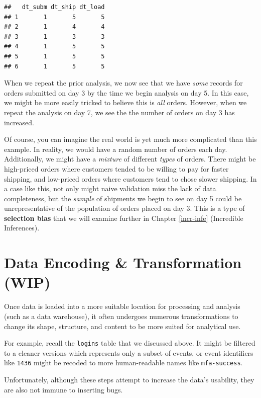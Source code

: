 \documentclass[
]{krantz}
\begin{document}
\begin{verbatim}
##   dt_subm dt_ship dt_load
## 1       1       5       5
## 2       1       4       4
## 3       1       3       3
## 4       1       5       5
## 5       1       5       5
## 6       1       5       5
\end{verbatim}

When we repeat the prior analysis, we now see that we have \emph{some} records for orders submitted on day 3 by the time we begin analysis on day 5.
In this case, we might be more easily tricked to believe this is \emph{all} orders.
However, when we repeat the analysis on day 7, we see the the number of orders on day 3 has increased.

Of course, you can imagine the real world is yet much more complicated than this example.
In reality, we would have a random number of orders each day.
Additionally, we might have a \emph{mixture} of different \emph{types} of orders.
There might be high-priced orders where customers tended to be willing to pay for faster shipping,
and low-priced orders where customers tend to chose slower shipping.
In a case like this, not only might naive validation miss the lack of data completeness, but the \emph{sample} of shipments we begin to see on day 5 could be unrepresentative of the population of orders placed on day 3.
This is a type of \textbf{selection bias} that we will examine further in Chapter \ref{incr-infe} (Incredible Inferences).

\hypertarget{data-encoding-transformation-wip}{%
\section{Data Encoding \& Transformation (WIP)}\label{data-encoding-transformation-wip}}

Once data is loaded into a more suitable location for processing and analysis (such as a data warehouse), it often undergoes numerous transformations to change its shape, structure, and content to be more suited for analytical use.

For example, recall the \texttt{logins} table that we discussed above. It might be filtered to a cleaner versions which represents only a subset of events, or event identifiers like \texttt{\textquotesingle{}1436\textquotesingle{}} might be recoded to more human-readable names like \texttt{\textquotesingle{}mfa-success\textquotesingle{}}.

Unfortunately, although these steps attempt to increase the data's usability, they are also not immune to inserting bugs.
\end{document}

